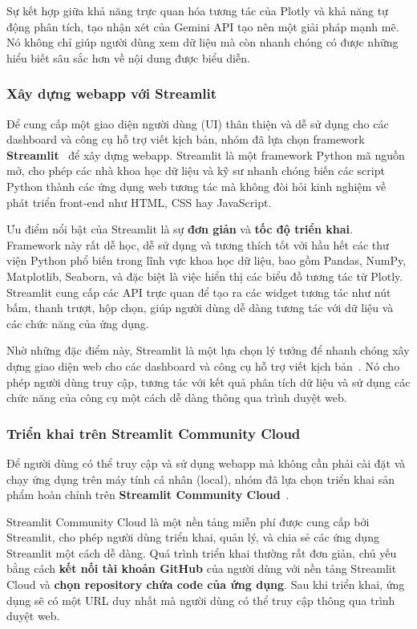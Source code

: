 Sự kết hợp giữa khả năng trực quan hóa tương tác của Plotly và khả năng tự động phân tích, tạo nhận xét của Gemini API tạo nên một giải pháp mạnh mẽ. Nó không chỉ giúp người dùng xem dữ liệu mà còn nhanh chóng có được những hiểu biết sâu sắc hơn về nội dung được biểu diễn.

\subsubsection{Xây dựng webapp với Streamlit}

Để cung cấp một giao diện người dùng (UI) thân thiện và dễ sử dụng cho các dashboard và công cụ hỗ trợ viết kịch bản, nhóm đã lựa chọn framework \textbf{Streamlit}~\cite{streamlit} để xây dựng webapp. Streamlit là một framework Python mã nguồn mở, cho phép các nhà khoa học dữ liệu và kỹ sư nhanh chóng biến các script Python thành các ứng dụng web tương tác mà không đòi hỏi kinh nghiệm về phát triển front-end như HTML, CSS hay JavaScript.

Ưu điểm nổi bật của Streamlit là sự \textbf{đơn giản} và \textbf{tốc độ triển khai}. Framework này rất dễ học, dễ sử dụng và tương thích tốt với hầu hết các thư viện Python phổ biến trong lĩnh vực khoa học dữ liệu, bao gồm Pandas, NumPy, Matplotlib, Seaborn, và đặc biệt là việc hiển thị các biểu đồ tương tác từ Plotly. Streamlit cung cấp các API trực quan để tạo ra các widget tương tác như nút bấm, thanh trượt, hộp chọn, giúp người dùng dễ dàng tương tác với dữ liệu và các chức năng của ứng dụng.

Nhờ những đặc điểm này, Streamlit là một lựa chọn lý tưởng để nhanh chóng xây dựng giao diện web cho các dashboard và công cụ hỗ trợ viết kịch bản~\cite{dashboard}. Nó cho phép người dùng truy cập, tương tác với kết quả phân tích dữ liệu và sử dụng các chức năng của công cụ một cách dễ dàng thông qua trình duyệt web.

\subsubsection{Triển khai trên Streamlit Community Cloud}

Để người dùng có thể truy cập và sử dụng webapp mà không cần phải cài đặt và chạy ứng dụng trên máy tính cá nhân (local), nhóm đã lựa chọn triển khai sản phẩm hoàn chỉnh trên \textbf{Streamlit Community Cloud}~\cite{deploy_app}.

Streamlit Community Cloud là một nền tảng miễn phí được cung cấp bởi Streamlit, cho phép người dùng triển khai, quản lý, và chia sẻ các ứng dụng Streamlit một cách dễ dàng. Quá trình triển khai thường rất đơn giản, chủ yếu bằng cách \textbf{kết nối tài khoản GitHub} của người dùng với nền tảng Streamlit Cloud và \textbf{chọn repository chứa code của ứng dụng}. Sau khi triển khai, ứng dụng sẽ có một URL duy nhất mà người dùng có thể truy cập thông qua trình duyệt web.

